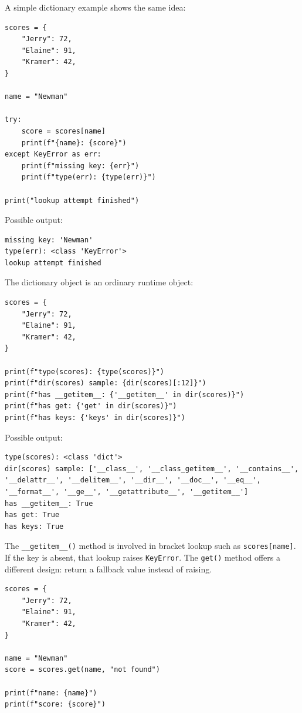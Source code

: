 \documentclass[a4paper,twoside]{report}
\begin{document}
A simple dictionary example shows the same idea:

\begin{verbatim}
scores = {
    "Jerry": 72,
    "Elaine": 91,
    "Kramer": 42,
}

name = "Newman"

try:
    score = scores[name]
    print(f"{name}: {score}")
except KeyError as err:
    print(f"missing key: {err}")
    print(f"type(err): {type(err)}")

print("lookup attempt finished")
\end{verbatim}

Possible output:

\begin{verbatim}
missing key: 'Newman'
type(err): <class 'KeyError'>
lookup attempt finished
\end{verbatim}

The dictionary object is an ordinary runtime object:

\begin{verbatim}
scores = {
    "Jerry": 72,
    "Elaine": 91,
    "Kramer": 42,
}

print(f"type(scores): {type(scores)}")
print(f"dir(scores) sample: {dir(scores)[:12]}")
print(f"has __getitem__: {'__getitem__' in dir(scores)}")
print(f"has get: {'get' in dir(scores)}")
print(f"has keys: {'keys' in dir(scores)}")
\end{verbatim}

Possible output:

\begin{verbatim}
type(scores): <class 'dict'>
dir(scores) sample: ['__class__', '__class_getitem__', '__contains__',
'__delattr__', '__delitem__', '__dir__', '__doc__', '__eq__',
'__format__', '__ge__', '__getattribute__', '__getitem__']
has __getitem__: True
has get: True
has keys: True
\end{verbatim}

The \texttt{\_\_getitem\_\_()} method is involved in bracket lookup such as \texttt{scores[name]}. If the key is absent, that lookup raises \texttt{KeyError}. The \texttt{get()} method offers a different design: return a fallback value instead of raising.

\begin{verbatim}
scores = {
    "Jerry": 72,
    "Elaine": 91,
    "Kramer": 42,
}

name = "Newman"
score = scores.get(name, "not found")

print(f"name: {name}")
print(f"score: {score}")
\end{verbatim}
\end{document}
